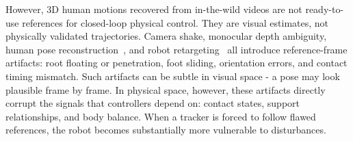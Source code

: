 \documentclass{article}
\begin{document}


	
	
	
	

	However, 3D human motions recovered from in-the-wild videos are not ready-to-use references for closed-loop physical control. They are visual estimates, not physically validated trajectories. Camera shake, monocular depth ambiguity, human pose reconstruction~\cite{}, and robot retargeting~\cite{} all introduce reference-frame artifacts: root floating or penetration, foot sliding, orientation errors, and contact timing mismatch. Such artifacts can be subtle in visual space - a pose may look plausible frame by frame. In physical space, however, these artifacts directly corrupt the signals that controllers depend on: contact states, support relationships, and body balance. When a tracker is forced to follow flawed references, the robot becomes substantially more vulnerable to disturbances.
	

	
	
	
	
\end{document}
